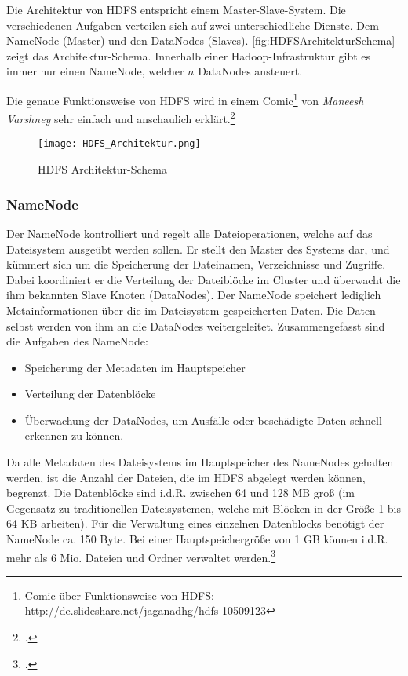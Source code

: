 Die Architektur von \ac{HDFS} entspricht einem Master-Slave-System. Die verschiedenen Aufgaben verteilen sich auf zwei unterschiedliche Dienste. Dem NameNode (Master) und den DataNodes (Slaves). \autoref{fig:HDFSArchitekturSchema} zeigt das Architektur-Schema. Innerhalb einer Hadoop-Infrastruktur gibt es immer nur einen NameNode, welcher $n$ DataNodes ansteuert.

Die genaue Funktionsweise von \ac{HDFS} wird in einem Comic\footnote{Comic über Funktionsweise von HDFS: \\ \url{http://de.slideshare.net/jaganadhg/hdfs-10509123}} von \textit{Maneesh Varshney} sehr einfach und anschaulich erklärt.\footcite[Vgl.][S. 22 f.]{Wartala.2012}

\newpage
\begin{figure}[h]
	\centering
	\texttt{[image: HDFS\_Architektur.png]}
	\caption{HDFS Architektur-Schema\footnotemark}
	\label{fig:HDFSArchitekturSchema}
\end{figure}

\subsubsection{NameNode}
Der NameNode kontrolliert und regelt alle Dateioperationen, welche auf das Dateisystem ausgeübt werden sollen. Er stellt den Master des Systems dar, und kümmert sich um die Speicherung der Dateinamen, Verzeichnisse und Zugriffe. Dabei koordiniert er die Verteilung der Dateiblöcke im Cluster und überwacht die ihm bekannten Slave Knoten (DataNodes). Der NameNode speichert lediglich Metainformationen über die im Dateisystem gespeicherten Daten. Die Daten selbst werden von ihm an die DataNodes weitergeleitet. Zusammengefasst sind die Aufgaben des NameNode:

\begin{itemize}
	\item Speicherung der Metadaten im Hauptspeicher
	\item Verteilung der Datenblöcke
	\item Überwachung der DataNodes, um Ausfälle oder beschädigte Daten schnell erkennen zu können.
\end{itemize}

Da alle Metadaten des Dateisystems im Hauptspeicher des NameNodes gehalten werden, ist die Anzahl der Dateien, die im \ac{HDFS} abgelegt werden können, begrenzt. Die Datenblöcke sind i.d.R. zwischen 64 und 128 \ac{MB} groß (im Gegensatz zu traditionellen Dateisystemen, welche mit Blöcken in der Größe 1 bis 64 \ac{KB} arbeiten). Für die Verwaltung eines einzelnen Datenblocks benötigt der NameNode ca. 150 Byte. Bei einer Hauptspeichergröße von 1 \ac{GB} können i.d.R. mehr als 6 Mio. Dateien und Ordner verwaltet werden.\footcite[Vgl.][S. 24]{Wartala.2012}

